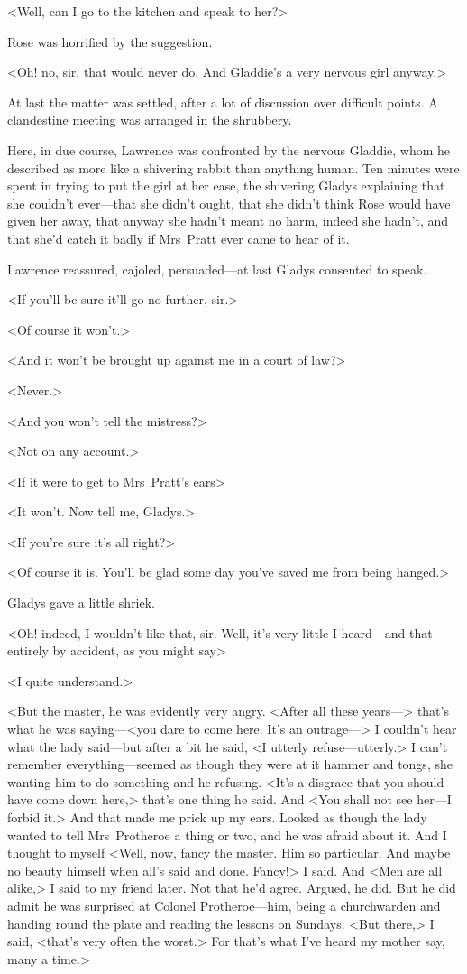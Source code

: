 <Well, can I go to the kitchen and speak to her?>

Rose was horrified by the suggestion.

<Oh! no, sir, that would never do. And Gladdie's a very nervous girl anyway.>

At last the matter was settled, after a lot of discussion over difficult points. A clandestine meeting was arranged in the shrubbery.

Here, in due course, Lawrence was confronted by the nervous Gladdie, whom he described as more like a shivering rabbit than anything human. Ten minutes were spent in trying to put the girl at her ease, the shivering Gladys explaining that she couldn't ever—that she didn't ought, that she didn't think Rose would have given her away, that anyway she hadn't meant no harm, indeed she hadn't, and that she'd catch it badly if Mrs~Pratt ever came to hear of it.

Lawrence reassured, cajoled, persuaded—at last Gladys consented to speak.

<If you'll be sure it'll go no further, sir.>

<Of course it won't.>

<And it won't be brought up against me in a court of law?>

<Never.>

<And you won't tell the mistress?>

<Not on any account.>

<If it were to get to Mrs~Pratt's ears\longdash>

<It won't. Now tell me, Gladys.>

<If you're sure it's all right?>

<Of course it is. You'll be glad some day you've saved me from being hanged.>

Gladys gave a little shriek.

<Oh! indeed, I wouldn't like that, sir. Well, it's very little I heard—and that entirely by accident, as you might say\longdash>

<I quite understand.>

<But the master, he was evidently very angry. <After all these years—> that's what he was saying—<you dare to come here. It's an outrage—> I couldn't hear what the lady said—but after a bit he said, <I utterly refuse—utterly.> I can't remember everything—seemed as though they were at it hammer and tongs, she wanting him to do something and he refusing. <It's a disgrace that you should have come down here,> that's one thing he said. And <You shall not see her—I forbid it.> And that made me prick up my ears. Looked as though the lady wanted to tell Mrs~Protheroe a thing or two, and he was afraid about it. And I thought to myself <Well, now, fancy the master. Him so particular. And maybe no beauty himself when all's said and done. Fancy!> I said. And <Men are all alike,> I said to my friend later. Not that he'd agree. Argued, he did. But he did admit he was surprised at Colonel Protheroe—him, being a churchwarden and handing round the plate and reading the lessons on Sundays. <But there,> I said, <that's very often the worst.> For that's what I've heard my mother say, many a time.>

